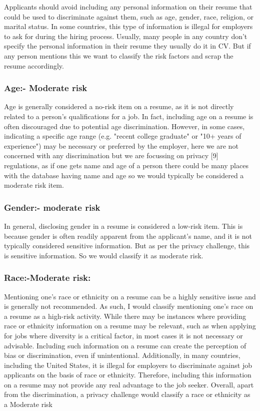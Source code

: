 \documentclass{article}
\begin{document}
Applicants should avoid including any personal information on their resume that could be used to discriminate against them, such as age, gender, race, religion, or marital status. In some countries, this type of information is illegal for employers to ask for during the hiring process. Usually, many people in any country don’t specify the personal information in their resume they usually do it in CV. But if any person mentions this we want to classify the risk factors and scrap the resume accordingly.


\subsubsection{Age:- Moderate risk}

Age is generally considered a no-risk item on a resume, as it is not directly related to a person's qualifications for a job. In fact, including age on a resume is often discouraged due to potential age discrimination. However, in some cases, indicating a specific age range (e.g. "recent college graduate" or "10+ years of experience") may be necessary or preferred by the employer, here we are not concerned with any discrimination but we are focussing on privacy [9] regulations, as if one gets name and age of a person there could be many places with the database having name and age  so we would typically be considered a moderate risk item.
\subsubsection{Gender:- moderate risk
}

In general, disclosing gender in a resume is considered a low-risk item. This is because gender is often readily apparent from the applicant's name, and it is not typically considered sensitive information. But as per the privacy challenge, this is sensitive information. So we would classify it as moderate risk.

\subsubsection{Race:-Moderate risk:}

Mentioning one's race or ethnicity on a resume can be a highly sensitive issue and is generally not recommended. As such, I would classify mentioning one's race on a resume as a high-risk activity.
While there may be instances where providing race or ethnicity information on a resume may be relevant, such as when applying for jobs where diversity is a critical factor, in most cases it is not necessary or advisable. Including such information on a resume can create the perception of bias or discrimination, even if unintentional.
Additionally, in many countries, including the United States, it is illegal for employers to discriminate against job applicants on the basis of race or ethnicity. Therefore, including this information on a resume may not provide any real advantage to the job seeker. Overall, apart from the discrimination, a privacy challenge would classify a race or ethnicity as a Moderate risk
\end{document}
